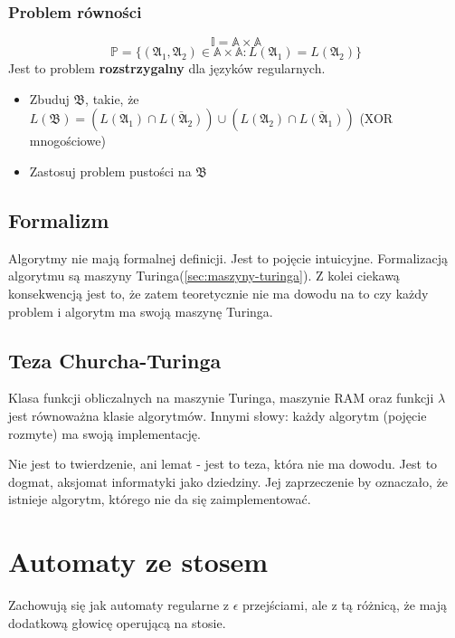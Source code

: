 \documentclass{../notatki}
\begin{document}
\subsubsection{Problem równości}

$$
\mathbb{I} = \mathbb{A} \times \mathbb{A}
$$
$$
\mathbb{P} = \{(\mathfrak{A}_1, \mathfrak{A}_2) \in \mathbb{A} \times
\mathbb{A} : L(\mathfrak{A}_1) = L(\mathfrak{A}_2)\}
$$
Jest to problem \textbf{rozstrzygalny} dla języków regularnych.

\begin{itemize}
  \item Zbuduj $\mathfrak{B}$, takie, że $L(\mathfrak{B}) =
    (L(\mathfrak{A_1}) \cap \overline{L(\mathfrak{A_2})}) \cup
    (L(\mathfrak{A_2}) \cap \overline{L(\mathfrak{A_1})})$ (XOR mnogościowe)
  \item Zastosuj problem pustości na $\mathfrak{B}$
\end{itemize}

\subsection{Formalizm}

Algorytmy nie mają formalnej definicji. Jest to pojęcie intuicyjne.
Formalizacją algorytmu są maszyny Turinga(\ref{sec:maszyny-turinga}).
Z kolei ciekawą konsekwencją jest to, że zatem teoretycznie nie ma dowodu na to
czy każdy problem i algorytm ma swoją maszynę Turinga.

\subsection{Teza Churcha-Turinga}

Klasa funkcji obliczalnych na maszynie Turinga, maszynie RAM oraz
funkcji $\lambda$ jest równoważna klasie algorytmów. Innymi słowy: każdy
algorytm (pojęcie rozmyte) ma swoją implementację.

Nie jest to twierdzenie, ani lemat - jest to teza, która nie ma dowodu. Jest to
dogmat, aksjomat informatyki jako dziedziny. Jej zaprzeczenie by oznaczało, że
istnieje algorytm, którego nie da się zaimplementować.

\section{Automaty ze stosem}

Zachowują się jak automaty regularne z $\epsilon$ przejściami, ale z tą różnicą,
że mają dodatkową głowicę operującą na stosie.
\end{document}
